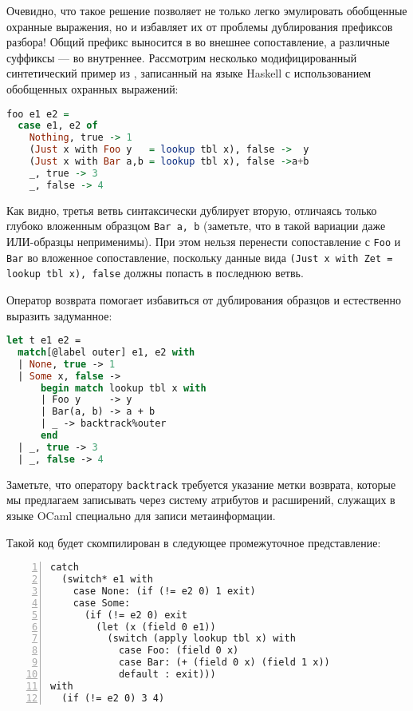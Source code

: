 Очевидно, что такое решение позволяет не только легко эмулировать обобщенные охранные выражения, но и избавляет их от проблемы дублирования префиксов разбора! Общий префикс выносится в во внешнее сопоставление, а различные суффиксы --- во внутреннее. Рассмотрим несколько модифицированный синтетический пример из \cite{discuss}, записанный на языке Haskell с использованием обобщенных охранных выражений:

\noindent
\begin{minipage}{\linewidth}
\begin{lstlisting}[language=haskell, escapechar=@]
foo e1 e2 = 
  case e1, e2 of
    Nothing, true -> 1
    (Just x with Foo y   = lookup tbl x), false ->  y
    (Just x with Bar a,b = lookup tbl x), false ->a+b
    _, true -> 3
    _, false -> 4
\end{lstlisting}
\end{minipage}

Как видно, третья ветвь синтаксически дублирует вторую, отличаясь только глубоко вложенным образцом \lstinline[breaklines]|Bar a, b| (заметьте, что в такой вариации даже ИЛИ-образцы неприменимы). При этом нельзя перенести сопоставление с \lstinline|Foo| и \lstinline|Bar| во вложенное сопоставление, поскольку данные вида \lstinline[breaklines=true,language=none]|(Just x with Zet = lookup tbl x), false| \linebreak должны попасть в последнюю ветвь.

Оператор возврата помогает избавиться от дублирования образцов и естественно выразить задуманное:

\noindent
\begin{minipage}{\linewidth}
\begin{lstlisting}[language=ocaml]
let t e1 e2 = 
  match[@label outer] e1, e2 with
  | None, true -> 1
  | Some x, false ->
      begin match lookup tbl x with
      | Foo y     -> y
      | Bar(a, b) -> a + b
      | _ -> backtrack%outer
      end
  | _, true -> 3
  | _, false -> 4
\end{lstlisting}
\end{minipage}

Заметьте, что оператору \lstinline|backtrack| требуется указание метки возврата, которые мы предлагаем записывать через систему атрибутов и расширений, служащих в языке OCaml специально для записи метаинформации.

Такой код будет скомпилирован в следующее промежуточное представление:

\begin{minipage}{\linewidth}
\begin{lstlisting}[language=lambda, numbers=left]
catch
  (switch* e1 with 
    case None: (if (!= e2 0) 1 exit) 
    case Some:
      (if (!= e2 0) exit 
        (let (x (field 0 e1))
          (switch (apply lookup tbl x) with
            case Foo: (field 0 x)
            case Bar: (+ (field 0 x) (field 1 x))
            default : exit)))
with
  (if (!= e2 0) 3 4)
\end{lstlisting}
\end{minipage}


